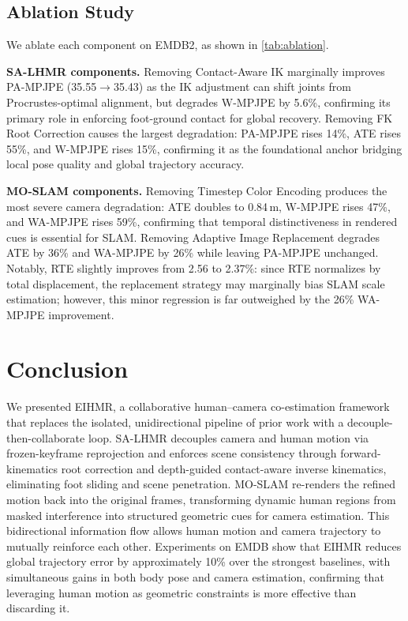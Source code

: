 \documentclass[runningheads]{llncs}
\begin{document}
\subsection{Ablation Study}
\label{sec:ablation}

We ablate each component on EMDB2, as shown in \cref{tab:ablation}.


\noindent\textbf{SA-LHMR components.}
Removing Contact-Aware IK marginally improves PA-MPJPE (35.55$\to$35.43) as the IK adjustment can shift joints from Procrustes-optimal alignment, but degrades W-MPJPE by 5.6\%, confirming its primary role in enforcing foot-ground contact for global recovery. Removing FK Root Correction causes the largest degradation: PA-MPJPE rises 14\%, ATE rises 55\%, and W-MPJPE rises 15\%, confirming it as the foundational anchor bridging local pose quality and global trajectory accuracy.

\noindent\textbf{MO-SLAM components.}
Removing Timestep Color Encoding produces the most severe camera degradation: ATE doubles to 0.84\,m, W-MPJPE rises 47\%, and WA-MPJPE rises 59\%, confirming that temporal distinctiveness in rendered cues is essential for SLAM. Removing Adaptive Image Replacement degrades ATE by 36\% and WA-MPJPE by 26\% while leaving PA-MPJPE unchanged. Notably, RTE slightly improves from 2.56 to 2.37\%: since RTE normalizes by total displacement, the replacement strategy may marginally bias SLAM scale estimation; however, this minor regression is far outweighed by the 26\% WA-MPJPE improvement.


\section{Conclusion}
\label{sec:conclusion}


We presented EIHMR, a collaborative human--camera co-estimation framework that replaces the isolated, unidirectional pipeline of prior work with a decouple-then-collaborate loop. SA-LHMR decouples camera and human motion via frozen-keyframe reprojection and enforces scene consistency through forward-kinematics root correction and depth-guided contact-aware inverse kinematics, eliminating foot sliding and scene penetration. MO-SLAM re-renders the refined motion back into the original frames, transforming dynamic human regions from masked interference into structured geometric cues for camera estimation. This bidirectional information flow allows human motion and camera trajectory to mutually reinforce each other. Experiments on EMDB show that EIHMR reduces global trajectory error by approximately 10\% over the strongest baselines, with simultaneous gains in both body pose and camera estimation, confirming that leveraging human motion as geometric constraints is more effective than discarding it.
\end{document}
